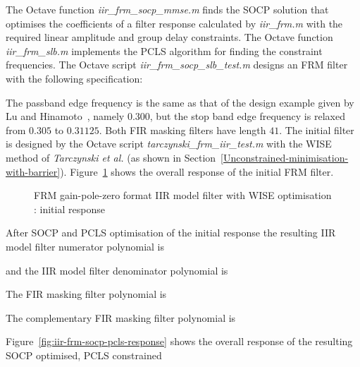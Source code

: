 \documentclass[a4paper,twoside,10pt,english]{report}
\begin{document}
The Octave function
\emph{iir\_frm\_socp\_mmse.m} finds the SOCP solution that optimises the 
coefficients of a filter response calculated by \emph{iir\_frm.m} with the 
required linear amplitude and group delay constraints. The Octave function 
\emph{iir\_frm\_slb.m} implements the PCLS algorithm for finding
the constraint frequencies. The Octave script 
\emph{iir\_frm\_socp\_slb\_test.m} designs an FRM filter with the 
following specification:
\begin{small}

\end{small}
The passband edge frequency is the same as that of the design example given by 
Lu and Hinamoto~\cite[Section V.E]{LuHinamoto_IIRFrequencyMaskingFiltersConeProgramming},
namely $0.300$, but the stop band edge frequency is relaxed from $0.305$ to 
$0.31125$. Both FIR masking filters have length $41$. The initial filter is 
designed by the Octave script \emph{tarczynski\_frm\_iir\_test.m}
with the WISE method of \emph{Tarczynski et al.} (as shown in 
Section~\ref{Unconstrained-minimisation-with-barrier}). 
Figure~\ref{fig:iir-frm-initial-response} shows the overall response of 
the initial FRM filter. 
\begin{figure}[!htbp]
\begin{center}
\scalebox{0.7}{}
\caption{FRM gain-pole-zero format IIR model filter with WISE optimisation : initial response}
\label{fig:iir-frm-initial-response}
\end{center}
\end{figure}
After SOCP and PCLS optimisation of the initial response
the resulting IIR model filter numerator polynomial is
\begin{small}

\end{small}
and the IIR model filter denominator polynomial is
\begin{small}

\end{small}
The FIR masking filter polynomial is
\begin{small}

\end{small}
The complementary FIR masking filter polynomial is
\begin{small}

\end{small}
Figure~\ref{fig:iir-frm-socp-pcls-response} 
shows the overall response of the resulting SOCP optimised, PCLS constrained
\end{document}

